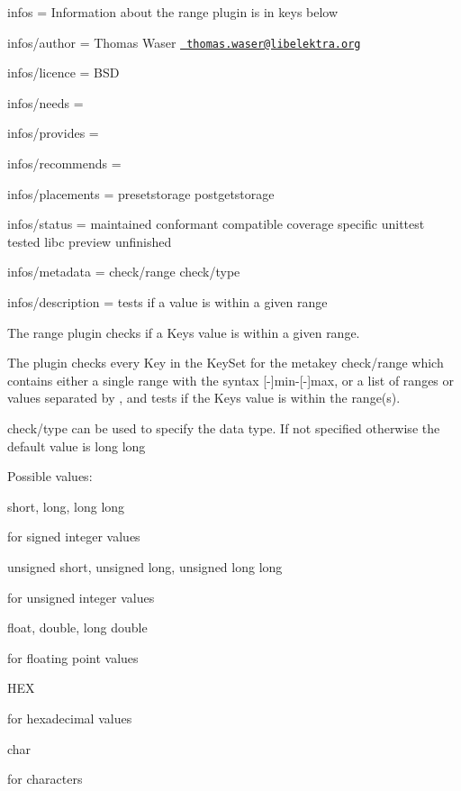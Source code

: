 
\begin{DoxyItemize}
\item infos = Information about the range plugin is in keys below
\item infos/author = Thomas Waser \href{mailto:thomas.waser@libelektra.org}{\texttt{ thomas.\+waser@libelektra.\+org}}
\item infos/licence = B\+SD
\item infos/needs =
\item infos/provides =
\item infos/recommends =
\item infos/placements = presetstorage postgetstorage
\item infos/status = maintained conformant compatible coverage specific unittest tested libc preview unfinished
\item infos/metadata = check/range check/type
\item infos/description = tests if a value is within a given range
\end{DoxyItemize}

The range plugin checks if a {\ttfamily Key}\textquotesingle{}s value is within a given range.

The plugin checks every {\ttfamily Key} in the {\ttfamily Key\+Set} for the metakey {\ttfamily check/range} which contains either a single range with the syntax {\ttfamily \mbox{[}-\/\mbox{]}min-\/\mbox{[}-\/\mbox{]}max}, or a list of ranges or values separated by {\ttfamily ,} and tests if the {\ttfamily Key}\textquotesingle{}s value is within the range(s).

{\ttfamily check/type} can be used to specify the data type. If not specified otherwise the default value is {\ttfamily long long}

Possible values\+:


\begin{DoxyItemize}
\item {\ttfamily short}, {\ttfamily long}, {\ttfamily long long}

for signed integer values
\item {\ttfamily unsigned short}, {\ttfamily unsigned long}, {\ttfamily unsigned long long}

for unsigned integer values
\item {\ttfamily float}, {\ttfamily double}, {\ttfamily long double}

for floating point values
\item {\ttfamily H\+EX}

for hexadecimal values
\item {\ttfamily char}

for characters
\end{DoxyItemize}

